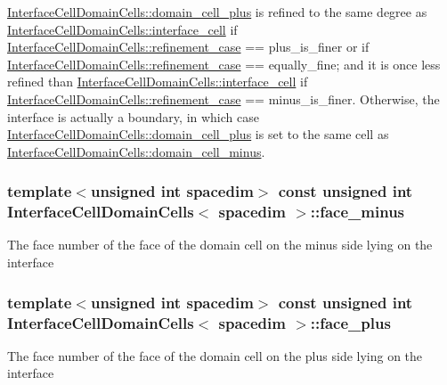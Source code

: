 \hyperlink{class_interface_cell_domain_cells_a72c7faaed3a84c546d47960f1064f9df}{Interface\+Cell\+Domain\+Cells\+::domain\+\_\+cell\+\_\+plus} is refined to the same degree as \hyperlink{class_interface_cell_domain_cells_acabc5a62be3f7742c3c334ae1777fbd5}{Interface\+Cell\+Domain\+Cells\+::interface\+\_\+cell} if \hyperlink{class_interface_cell_domain_cells_ab1b5469ca5c40256942ea179abbba92c}{Interface\+Cell\+Domain\+Cells\+::refinement\+\_\+case} == {\ttfamily plus\+\_\+is\+\_\+finer} or if \hyperlink{class_interface_cell_domain_cells_ab1b5469ca5c40256942ea179abbba92c}{Interface\+Cell\+Domain\+Cells\+::refinement\+\_\+case} == {\ttfamily equally\+\_\+fine}; and it is once less refined than \hyperlink{class_interface_cell_domain_cells_acabc5a62be3f7742c3c334ae1777fbd5}{Interface\+Cell\+Domain\+Cells\+::interface\+\_\+cell} if \hyperlink{class_interface_cell_domain_cells_ab1b5469ca5c40256942ea179abbba92c}{Interface\+Cell\+Domain\+Cells\+::refinement\+\_\+case} == {\ttfamily minus\+\_\+is\+\_\+finer}. Otherwise, the interface is actually a boundary, in which case \hyperlink{class_interface_cell_domain_cells_a72c7faaed3a84c546d47960f1064f9df}{Interface\+Cell\+Domain\+Cells\+::domain\+\_\+cell\+\_\+plus} is set to the same cell as \hyperlink{class_interface_cell_domain_cells_ae610a6a7b0ff4a421ee051cb873bbc22}{Interface\+Cell\+Domain\+Cells\+::domain\+\_\+cell\+\_\+minus}. 
\subsubsection[{\texorpdfstring{face\+\_\+minus}{face_minus}}]{\setlength{\rightskip}{0pt plus 5cm}template$<$unsigned int spacedim$>$ const unsigned int {\bf Interface\+Cell\+Domain\+Cells}$<$ spacedim $>$\+::face\+\_\+minus}\hypertarget{class_interface_cell_domain_cells_a51a9eaf54de991f5fa432220b09205cd}{}\label{class_interface_cell_domain_cells_a51a9eaf54de991f5fa432220b09205cd}
The face number of the face of the domain cell on the minus side lying on the interface 
\subsubsection[{\texorpdfstring{face\+\_\+plus}{face_plus}}]{\setlength{\rightskip}{0pt plus 5cm}template$<$unsigned int spacedim$>$ const unsigned int {\bf Interface\+Cell\+Domain\+Cells}$<$ spacedim $>$\+::face\+\_\+plus}\hypertarget{class_interface_cell_domain_cells_a8780275f79c7137ef65df9b7d4039017}{}\label{class_interface_cell_domain_cells_a8780275f79c7137ef65df9b7d4039017}
The face number of the face of the domain cell on the plus side lying on the interface 
